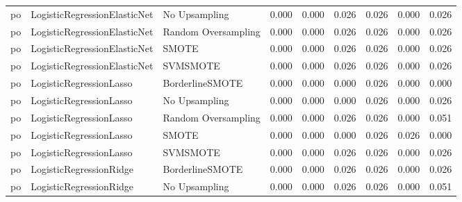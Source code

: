 \begin{tabular}{lllllllll}
      po & LogisticRegressionElasticNet &       No Upsampling & 0.000 &                     0.000 &                 0.026 &                  0.026 &                                   0.000 &     0.026 \\
      po & LogisticRegressionElasticNet & Random Oversampling & 0.000 &                     0.000 &                 0.026 &                  0.026 &                                   0.000 &     0.026 \\
      po & LogisticRegressionElasticNet &               SMOTE & 0.000 &                     0.000 &                 0.026 &                  0.026 &                                   0.000 &     0.026 \\
      po & LogisticRegressionElasticNet &            SVMSMOTE & 0.000 &                     0.000 &                 0.026 &                  0.026 &                                   0.000 &     0.026 \\
      po &      LogisticRegressionLasso &     BorderlineSMOTE & 0.000 &                     0.000 &                 0.000 &                  0.026 &                                   0.000 &     0.000 \\
      po &      LogisticRegressionLasso &       No Upsampling & 0.000 &                     0.000 &                 0.000 &                  0.026 &                                   0.000 &     0.026 \\
      po &      LogisticRegressionLasso & Random Oversampling & 0.000 &                     0.000 &                 0.026 &                  0.026 &                                   0.000 &     0.051 \\
      po &      LogisticRegressionLasso &               SMOTE & 0.000 &                     0.000 &                 0.000 &                  0.026 &                                   0.026 &     0.000 \\
      po &      LogisticRegressionLasso &            SVMSMOTE & 0.000 &                     0.000 &                 0.026 &                  0.026 &                                   0.000 &     0.026 \\
      po &      LogisticRegressionRidge &     BorderlineSMOTE & 0.000 &                     0.000 &                 0.026 &                  0.026 &                                   0.000 &     0.026 \\
      po &      LogisticRegressionRidge &       No Upsampling & 0.000 &                     0.000 &                 0.026 &                  0.026 &                                   0.000 &     0.051 \\

\end{tabular}
